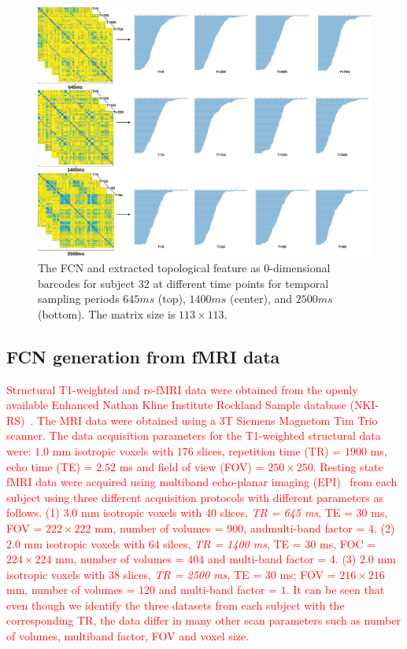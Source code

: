 \begin{figure}[H]%
	\centering	
	\includegraphics[width=1\textwidth, trim={0cm, 0.0cm, 0.0cm, 0.0cm}]{figures/stacked.png}
	\caption{The FCN and extracted topological feature as 0-dimensional barcodes for subject $32$ at different time points for temporal sampling periods $645ms$ (top), $1400ms$ (center), and $2500ms$ (bottom). The matrix size is $113 \times 113$.}
	\label{fig:wd1}
\end{figure}

\subsection{FCN generation from fMRI data}
\label{sec:fmri_to_fcn}
\textcolor{red}{
Structural T1-weighted and rs-fMRI data were obtained from the openly available Enhanced Nathan Kline Institute Rockland Sample database (NKI-RS)~\cite{nooner2012nki}. 
The MRI data were obtained using a 3T Siemens Magnetom Tim Trio scanner. 
The data acquisition parameters for the T1-weighted structural data were: $1.0$ mm isotropic voxels with 176 slices, 
repetition time (TR) = $1900$ ms,
echo time (TE) = $2.52$ ms and field of view (FOV) = $250 \times 250$.
Resting state fMRI data were acquired using multiband echo-planar imaging (EPI)~\cite{feinberg2010multiplexed} from each subject using three different acquisition protocols with different parameters as follows. 
(1) $3.0$ mm isotropic voxels with $40$ slices, \emph{TR = 645 ms}, TE = $30$ ms, FOV = $222 \times 222$ mm, number of volumes = $900$, andmulti-band factor = $4$.
(2) $2.0$ mm isotropic voxels with $64$ silces, \emph{TR = 1400 ms}, TE = $30$ ms, FOC = $224 \times 224$ mm, number of volumes = $404$ and multi-band factor = $4$. (3)
$2.0$ mm isotropic voxels with 38 slices, \emph{TR = 2500 ms}, TE = $30$ ms; FOV = $216 \times 216$ mm, number of volumes = $120$ and multi-band factor = $1$.
It can be seen that even though we identify the three datasets from each subject with the corresponding TR, the data differ in many other scan parameters such as number of volumes, multiband factor, FOV and voxel size.
}

